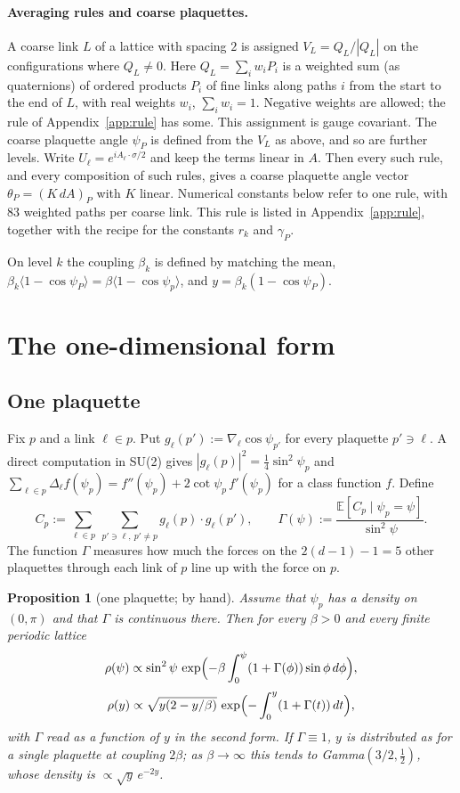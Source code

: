 \documentclass[11pt,a4paper]{article}
\newtheorem{proposition}[theorem]{Proposition}
\theoremstyle{definition}
\theoremstyle{remark}
\newcommand{\E}{\mathbb{E}}
\begin{document}
\paragraph{Averaging rules and coarse plaquettes.} A coarse link $L$ of a lattice with spacing $2$ is assigned $V_L=Q_L/|Q_L|$ on the configurations where $Q_L\ne0$. Here $Q_L=\sum_iw_iP_i$ is a weighted sum (as quaternions) of ordered products $P_i$ of fine links along paths $i$ from the start to the end of $L$, with real weights $w_i$, $\sum_iw_i=1$. Negative weights are allowed; the rule of Appendix~\ref{app:rule} has some. This assignment is gauge covariant. The coarse plaquette angle $\psi_P$ is defined from the $V_L$ as above, and so are further levels. Write $U_\ell=e^{iA_\ell\cdot\sigma/2}$ and keep the terms linear in $A$. Then every such rule, and every composition of such rules, gives a coarse plaquette angle vector $\theta_P=(K\,dA)_P$ with $K$ linear. Numerical constants below refer to one rule, with 83 weighted paths per coarse link. This rule is listed in Appendix~\ref{app:rule}, together with the recipe for the constants $r_k$ and $\gamma_P$.

On level $k$ the coupling $\beta_k$ is defined by matching the mean, $\beta_k\langle1-\cos\psi_P\rangle=\beta\langle1-\cos\psi_p\rangle$, and $y=\beta_k(1-\cos\psi_P)$.

\section{The one-dimensional form}\label{sec:sd}

\subsection{One plaquette}

Fix $p$ and a link $\ell\in p$. Put $g_\ell(p'):=\nabla_\ell\cos\psi_{p'}$ for every plaquette $p'\ni\ell$. A direct computation in SU(2) gives $|g_\ell(p)|^2=\tfrac14\sin^2\psi_p$ and $\sum_{\ell\in p}\Delta_\ell f(\psi_p)=f''(\psi_p)+2\cot\psi_p\,f'(\psi_p)$ for a class function $f$. Define
\[
C_p:=\sum_{\ell\in p}\ \sum_{p'\ni\ell,\ p'\ne p}g_\ell(p)\cdot g_\ell(p'),\qquad \Gamma(\psi):=\frac{\E[C_p\mid\psi_p=\psi]}{\sin^2\psi}.
\]
The function $\Gamma$ measures how much the forces on the $2(d-1)-1=5$ other plaquettes through each link of $p$ line up with the force on $p$.

\begin{proposition}[one plaquette; by hand]\label{prop:one}
Assume that $\psi_p$ has a density on $(0,\pi)$ and that $\Gamma$ is continuous there. Then for every $\beta>0$ and every finite periodic lattice
\[
\rho(\psi)\propto\sin^2\psi\,\exp\Bigl(-\beta\int_0^\psi(1+\Gamma(\phi))\sin\phi\,d\phi\Bigr),\]\[
\rho(y)\propto\sqrt{y(2-y/\beta)}\,\exp\Bigl(-\int_0^y(1+\Gamma(t))\,dt\Bigr),
\]
with $\Gamma$ read as a function of $y$ in the second form. If $\Gamma\equiv1$, $y$ is distributed as for a single plaquette at coupling $2\beta$; as $\beta\to\infty$ this tends to Gamma$(3/2,\tfrac12)$, whose density is $\propto\sqrt y\,e^{-2y}$.
\end{proposition}
\end{document}
